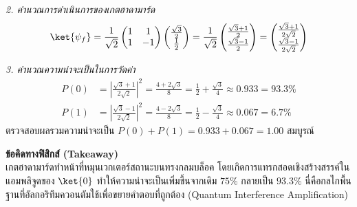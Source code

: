 \begin{psctexample}
\textit{2. คำนวณการดำเนินการของเกตฮาดามาร์ด}
\begin{equation}
\ket{\psi_f} = \frac{1}{\sqrt{2}} \begin{pmatrix} 1 & 1 \\ 1 & -1 \end{pmatrix} \begin{pmatrix} \frac{\sqrt{3}}{2} \\ \frac{1}{2} \end{pmatrix} = \frac{1}{\sqrt{2}} \begin{pmatrix} \frac{\sqrt{3}+1}{2} \\ \frac{\sqrt{3}-1}{2} \end{pmatrix} = \begin{pmatrix} \frac{\sqrt{3}+1}{2\sqrt{2}} \\ \frac{\sqrt{3}-1}{2\sqrt{2}} \end{pmatrix}
\end{equation}

\textit{3. คำนวณความน่าจะเป็นในการวัดค่า}
\begin{align}
P(0) &= \left| \frac{\sqrt{3}+1}{2\sqrt{2}} \right|^2 = \frac{4 + 2\sqrt{3}}{8} = \frac{1}{2} + \frac{\sqrt{3}}{4} \approx 0.933 = 93.3\% \\
P(1) &= \left| \frac{\sqrt{3}-1}{2\sqrt{2}} \right|^2 = \frac{4 - 2\sqrt{3}}{8} = \frac{1}{2} - \frac{\sqrt{3}}{4} \approx 0.067 = 6.7\%
\end{align}
ตรวจสอบผลรวมความน่าจะเป็น $P(0) + P(1) = 0.933 + 0.067 = 1.00$ สมบูรณ์

\textbf{ข้อคิดทางฟิสิกส์ (Takeaway)} \\
เกตฮาดามาร์ดทำหน้าที่หมุนเวกเตอร์สถานะบนทรงกลมบล็อค โดยเกิดการแทรกสอดเชิงสร้างสรรค์ในแอมพลิจูดของ $\ket{0}$ ทำให้ความน่าจะเป็นเพิ่มขึ้นจากเดิม $75\%$ กลายเป็น $93.3\%$ นี่คือกลไกพื้นฐานที่อัลกอริทึมควอนตัมใช้เพื่อขยายคำตอบที่ถูกต้อง (Quantum Interference Amplification)
\qedexam
\end{psctexample}

